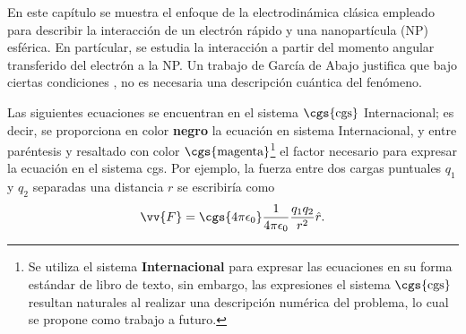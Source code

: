 En este capítulo se muestra el enfoque de la electrodinámica clásica empleado para describir la interacción de un electrón rápido y una nanopartícula (NP) esférica. En partícular, se estudia la interacción a partir del momento angular transferido del electrón a la NP. Un trabajo de García de Abajo \cite{deabajo2021optical} justifica que bajo ciertas condiciones , no es necesaria una descripción cuántica del fenómeno.

Las siguientes ecuaciones se encuentran en el sistema $\cgs{\text{cgs}}$ Internacional; es decir, se proporciona en color \textbf{negro} la ecuación en sistema Internacional, y entre paréntesis y resaltado con color $\cgs{\text{magenta}}$\footnote{Se utiliza el sistema \textbf{Internacional} para expresar las ecuaciones en su forma estándar de libro de texto, sin embargo, las expresiones el sistema $\cgs{\text{cgs}}$ resultan naturales al realizar una descripción numérica del problema, lo cual se propone como trabajo a futuro. } el factor necesario para expresar la ecuación en el sistema cgs. Por ejemplo, la fuerza entre dos cargas puntuales $q_1$ y $q_2$ separadas una distancia $r$ se escribiría como
\begin{equation}
\vv{F} = \cgs{4\pi\epsilon_0}\frac{1}{4\pi\epsilon_0} \frac{q_1 q_2}{r^2} \hat{r}.
\end{equation}
%
%
